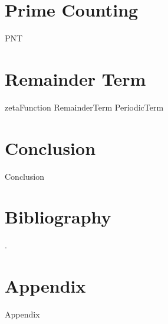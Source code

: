 \documentclass[12pt,a4paper]{article}
\begin{document}
\section{Prime Counting}
{PNT}
\section{Remainder Term}
{zetaFunction}
{RemainderTerm}
{PeriodicTerm}
\section{Conclusion}
{Conclusion}

\section{Bibliography}
.

\section{Appendix}
{Appendix}
\end{document}
